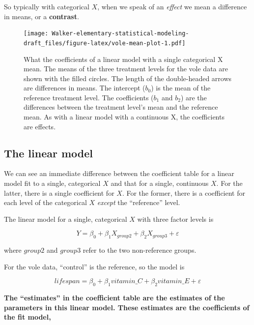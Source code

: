 \documentclass[]{book}
\begin{document}
So typically with categorical \(X\), when we speak of an \emph{effect} we mean a difference in means, or a \textbf{contrast}.

\begin{figure}
\centering
\texttt{[image: Walker-elementary-statistical-modeling-draft\_files/figure-latex/vole-mean-plot-1.pdf]}
\caption{\label{fig:vole-mean-plot}What the coefficients of a linear model with a single categorical X mean. The means of the three treatment levels for the vole data are shown with the filled circles. The length of the double-headed arrows are differences in means. The intercept (\(b_0\)) is the mean of the reference treatment level. The coefficients (\(b_1\) and \(b_2\)) are the differences between the treatment level's mean and the reference mean. As with a linear model with a continuous X, the coefficients are effects.}
\end{figure}

\hypertarget{the-linear-model}{%
\subsection{The linear model}\label{the-linear-model}}

We can see an immediate difference between the coefficient table for a linear model fit to a single, categorical \(X\) and that for a single, continuous \(X\). For the latter, there is a single coefficient for \(X\). For the former, there is a coefficient for each level of the categorical \(X\) \emph{except} the ``reference'' level.

The linear model for a single, categorical \(X\) with three factor levels is

\begin{equation}
Y = \beta_0 + \beta_1 X_{group2} + \beta_2 X_{group3} + \varepsilon
\end{equation}

where \(group2\) and \(group3\) refer to the two non-reference groups.

For the vole data, ``control'' is the reference, so the model is

\begin{equation}
lifespan = \beta_0 + \beta_1 vitamin\_C + \beta_2 vitamin\_E + \varepsilon
\end{equation}

\textbf{The ``estimates'' in the coefficient table are the estimates of the parameters in this linear model. These estimates are the coefficients of the fit model,}
\end{document}
